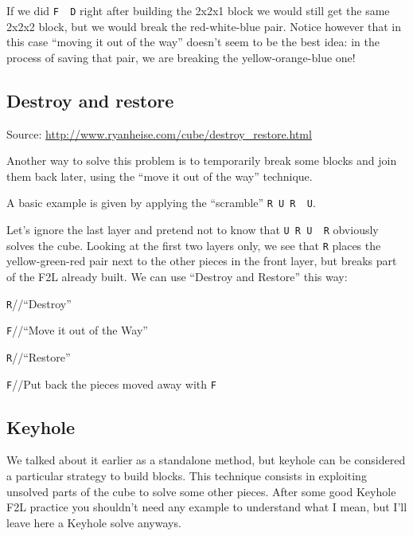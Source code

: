 \documentclass[11pt,a4paper]{book}
\newcommand{\p}{\textquotesingle}
\newcommand{\m}{\texttt}
\newcommand{\ps}{\p\,\,}
\newcommand{\comment}[1]{{\color{gray}\quad//#1}}
\begin{document}
If we did \m{F\ps D\p} right after building the 2x2x1 block we would still get the same 2x2x2 block, but we would break the red-white-blue pair. Notice however that in this case ``moving it out of the way'' doesn't seem to be the best idea: in the process of saving that pair, we are breaking the yellow-orange-blue one!

\subsection{Destroy and restore}

Source: \url{http://www.ryanheise.com/cube/destroy_restore.html}\bigskip

Another way to solve this problem is to temporarily break some blocks and join them back later, using the ``move it out of the way'' technique.

A basic example is given by applying the ``scramble'' \m{R U R\ps U\p}.

\begin{center}

\end{center}

Let's ignore the last layer and pretend not to know that \m{U R U\ps R\p} obviously solves the cube. Looking at the first two layers only, we see that \m{R\p} places the yellow-green-red pair next to the other pieces in the front layer, but breaks part of the F2L already built. We can use “Destroy and Restore” this way:

\bigskip
\m{R\p}\comment{``Destroy''}

\m{F}\comment{``Move it out of the Way''}

\m R\comment{``Restore''}

\m{F\p}\comment{Put back the pieces moved away with \m F}

\subsection{Keyhole}

We talked about it earlier as a standalone method, but keyhole can be considered a particular strategy to build blocks. This  technique consists in exploiting unsolved parts of the cube to solve some other pieces. After some good Keyhole F2L practice you shouldn't need any example to understand what I mean, but I'll leave here a Keyhole solve anyways.
\end{document}
